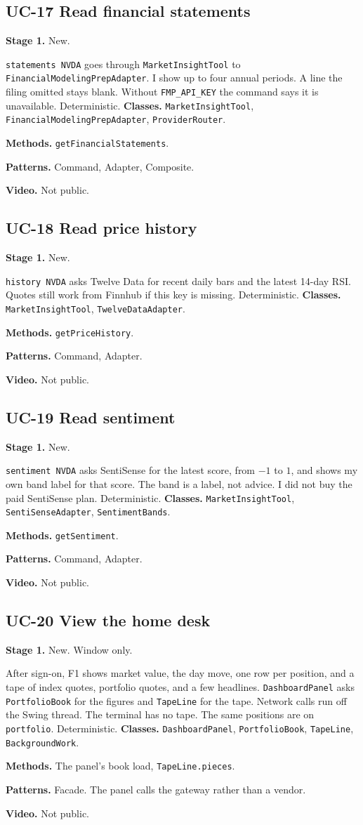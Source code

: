\documentclass[11pt]{article}
\newcommand{\field}[2]{\textbf{#1.} #2\par}
\begin{document}
\subsection{UC-17 Read financial statements}
\field{Stage 1}{New.}
\texttt{statements NVDA} goes through \texttt{MarketInsightTool} to \texttt{FinancialModelingPrepAdapter}. I show up to four annual periods. A line the filing omitted stays blank. Without \texttt{FMP\_API\_KEY} the command says it is unavailable. Deterministic.
\field{Classes}{\texttt{MarketInsightTool}, \texttt{FinancialModelingPrepAdapter}, \texttt{ProviderRouter}.}
\field{Methods}{\texttt{getFinancialStatements}.}
\field{Patterns}{Command, Adapter, Composite.}
\field{Video}{Not public.}

\subsection{UC-18 Read price history}
\field{Stage 1}{New.}
\texttt{history NVDA} asks Twelve Data for recent daily bars and the latest 14-day RSI. Quotes still work from Finnhub if this key is missing. Deterministic.
\field{Classes}{\texttt{MarketInsightTool}, \texttt{TwelveDataAdapter}.}
\field{Methods}{\texttt{getPriceHistory}.}
\field{Patterns}{Command, Adapter.}
\field{Video}{Not public.}

\subsection{UC-19 Read sentiment}
\field{Stage 1}{New.}
\texttt{sentiment NVDA} asks SentiSense for the latest score, from $-1$ to $1$, and shows my own band label for that score. The band is a label, not advice. I did not buy the paid SentiSense plan. Deterministic.
\field{Classes}{\texttt{MarketInsightTool}, \texttt{SentiSenseAdapter}, \texttt{SentimentBands}.}
\field{Methods}{\texttt{getSentiment}.}
\field{Patterns}{Command, Adapter.}
\field{Video}{Not public.}

\subsection{UC-20 View the home desk}
\field{Stage 1}{New. Window only.}
After sign-on, F1 shows market value, the day move, one row per position, and a tape of index quotes, portfolio quotes, and a few headlines. \texttt{DashboardPanel} asks \texttt{PortfolioBook} for the figures and \texttt{TapeLine} for the tape. Network calls run off the Swing thread. The terminal has no tape. The same positions are on \texttt{portfolio}. Deterministic.
\field{Classes}{\texttt{DashboardPanel}, \texttt{PortfolioBook}, \texttt{TapeLine}, \texttt{BackgroundWork}.}
\field{Methods}{The panel's book load, \texttt{TapeLine.pieces}.}
\field{Patterns}{Facade. The panel calls the gateway rather than a vendor.}
\field{Video}{Not public.}
\end{document}

